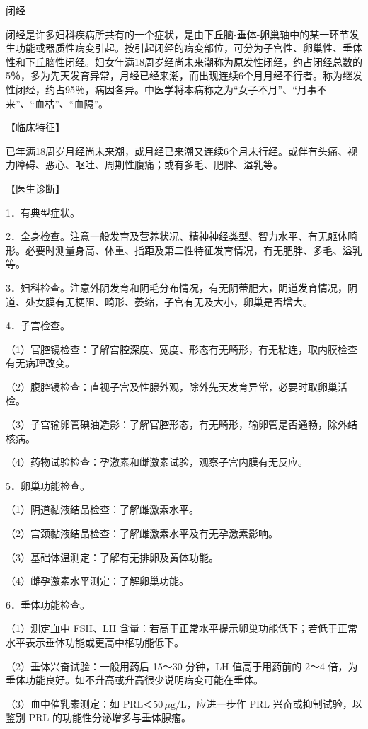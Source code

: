 \documentclass[12pt,UTF8,openany]{ctexbook}
\begin{document}
闭经


闭经是许多妇科疾病所共有的一个症状，是由下丘脑-垂体-卵巢轴中的某一环节发生功能或器质性病变引起。按引起闭经的病变部位，可分为子宫性、卵巢性、垂体性和下丘脑性闭经。妇女年满18周岁经尚未来潮称为原发性闭经，约占闭经总数的5％，多为先天发育异常，月经已经来潮，而出现连续6个月月经不行者。称为继发性闭经，约占95％，病因各异。中医学将本病称之为“女子不月”、“月事不来”、“血枯”、“血隔”。

【临床特征】

已年满18周岁月经尚未来潮，或月经已来潮又连续6个月未行经。或伴有头痛、视力障碍、恶心、呕吐、周期性腹痛；或有多毛、肥胖、溢乳等。

【医生诊断】

1．有典型症状。

2．全身检查。注意一般发育及营养状况、精神神经类型、智力水平、有无躯体畸形。必要时测量身高、体重、指距及第二性特征发育情况，有无肥胖、多毛、溢乳等。

3．妇科检查。注意外阴发育和阴毛分布情况，有无阴蒂肥大，阴道发育情况，阴道、处女膜有无梗阻、畸形、萎缩，子宫有无及大小，卵巢是否增大。

4．子宫检查。

（1）官腔镜检查：了解宫腔深度、宽度、形态有无畸形，有无粘连，取内膜检查有无病理改变。

（2）腹腔镜检查：直视子宫及性腺外观，除外先天发育异常，必要时取卵巢活检。

（3）子宫输卵管碘油造影：了解官腔形态，有无畸形，输卵管是否通畅，除外结核病。

（4）药物试验检查：孕激素和雌激素试验，观察子宫内膜有无反应。

5．卵巢功能检查。

（1）阴道黏液结晶检查：了解雌激素水平。

（2）宫颈黏液结晶检查：了解雌激素水平及有无孕激素影响。

（3）基础体温测定：了解有无排卵及黄体功能。

（4）雌孕激素水平测定：了解卵巢功能。

6．垂体功能检查。

（1）测定血中 FSH、LH 含量：若高于正常水平提示卵巢功能低下；若低于正常水平表示垂体功能或更高中枢功能低下。

（2）垂体兴奋试验：一般用药后 15～30 分钟，LH 值高于用药前的 2～4 倍，为垂体功能良好。如不升高或升高很少说明病变可能在垂体。

（3）血中催乳素测定：如 PRL＜$50\,\mu\mathrm{g}/\mathrm{L}$，应进一步作 PRL 兴奋或抑制试验，以鉴别 PRL 的功能性分泌增多与垂体腺瘤。
\end{document}
